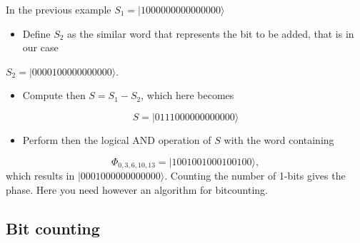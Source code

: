 \documentclass[%
oneside,                 %
final,                   %
10pt]{article}
\begin{document}
\noindent
In the previous example $S_1=|1000000000000000\rangle$
\begin{itemize}
\item Define $S_2$ as the similar word that represents the bit to be added, that is in our case
\end{itemize}

\noindent
$S_2=|0000100000000000\rangle$.
\begin{itemize}
\item Compute then $S=S_1-S_2$, which here becomes
\end{itemize}

\noindent
\[
S=|0111000000000000\rangle
\]
\begin{itemize}
\item Perform then the logical AND operation of $S$ with the word containing 
\end{itemize}

\noindent
\[
\Phi_{0,3,6,10,13} = |1001001000100100\rangle,
\]
which results in $|0001000000000000\rangle$. Counting the number of 1-bits gives the phase.  Here you need however an algorithm for bitcounting.



\subsection*{Bit counting}

\paragraph{}
\end{document}
